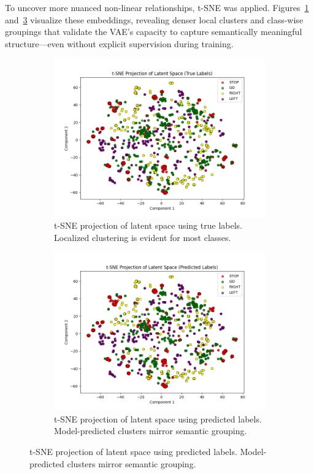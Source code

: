 To uncover more nuanced non-linear relationships, t-SNE was applied. Figures~\ref{fig:tsne_true} and~\ref{fig:tsne_pred} visualize these embeddings, revealing denser local clusters and class-wise groupings that validate the VAE’s capacity to capture semantically meaningful structure—even without explicit supervision during training.

\begin{figure}[htbp]
    \centering
    \begin{subfigure}[b]{0.49\textwidth}
        \includegraphics[width=\textwidth]{img/vae_results/tsne_latent_space_true_labels.png}
        \caption{t-SNE projection of latent space using true labels. Localized clustering is evident for most classes.}
        \label{fig:tsne_true}
    \end{subfigure}
    \hfill
    \begin{subfigure}[b]{0.49\textwidth}
        \includegraphics[width=\textwidth]{img/vae_results/tsne_latent_space_predicted_labels.png}
        \caption{t-SNE projection of latent space using predicted labels. Model-predicted clusters mirror semantic grouping.}
        \label{fig:tsne_pred}
    \end{subfigure}
\end{figure}

